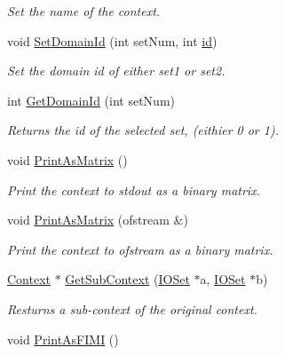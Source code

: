 \begin{DoxyCompactItemize}
\begin{DoxyCompactList}\small\item\em Set the name of the context. \item\end{DoxyCompactList}\item 
void \hyperlink{class_context_ac7eb147a11e84e49cda654ecc3812fe5}{SetDomainId} (int setNum, int \hyperlink{class_context_a134a1f80c8256db2afdb6d6f3096e0d6}{id})
\begin{DoxyCompactList}\small\item\em Set the domain id of either set1 or set2. \item\end{DoxyCompactList}\item 
\hypertarget{class_context_aaa470e3eb23649e665329a5764a16019}{
int \hyperlink{class_context_aaa470e3eb23649e665329a5764a16019}{GetDomainId} (int setNum)}
\label{class_context_aaa470e3eb23649e665329a5764a16019}

\begin{DoxyCompactList}\small\item\em Returns the id of the selected set, (eithier 0 or 1). \item\end{DoxyCompactList}\item 
\hypertarget{class_context_af7785111a88d3e31d7168e3f9aed2759}{
void \hyperlink{class_context_af7785111a88d3e31d7168e3f9aed2759}{PrintAsMatrix} ()}
\label{class_context_af7785111a88d3e31d7168e3f9aed2759}

\begin{DoxyCompactList}\small\item\em Print the context to stdout as a binary matrix. \item\end{DoxyCompactList}\item 
\hypertarget{class_context_aac2e8802d5547c971735b1e1b496c90f}{
void \hyperlink{class_context_aac2e8802d5547c971735b1e1b496c90f}{PrintAsMatrix} (ofstream \&)}
\label{class_context_aac2e8802d5547c971735b1e1b496c90f}

\begin{DoxyCompactList}\small\item\em Print the context to ofstream as a binary matrix. \item\end{DoxyCompactList}\item 
\hyperlink{class_context}{Context} $\ast$ \hyperlink{class_context_a8bfdcf16db7537122236cab328358e8d}{GetSubContext} (\hyperlink{class_i_o_set}{IOSet} $\ast$a, \hyperlink{class_i_o_set}{IOSet} $\ast$b)
\begin{DoxyCompactList}\small\item\em Resturns a sub-\/context of the original context. \item\end{DoxyCompactList}\item 
\hypertarget{class_context_a1ce45f00711d65af754a964a2b41623d}{
void \hyperlink{class_context_a1ce45f00711d65af754a964a2b41623d}{PrintAsFIMI} ()}
\label{class_context_a1ce45f00711d65af754a964a2b41623d}


\end{DoxyCompactItemize}
